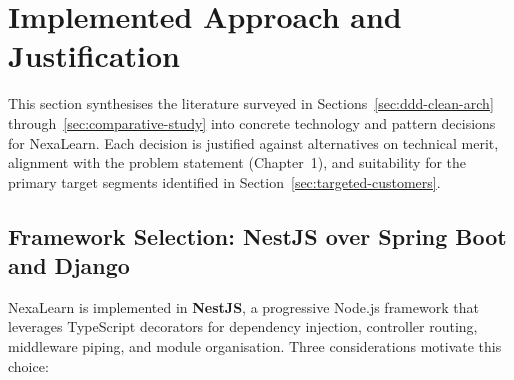 
\section{Implemented Approach and Justification}
\label{sec:implemented-approach}

This section synthesises the literature surveyed in Sections~\ref{sec:ddd-clean-arch} through~\ref{sec:comparative-study} into concrete technology and pattern decisions for NexaLearn. Each decision is justified against alternatives on technical merit, alignment with the problem statement (Chapter~1), and suitability for the primary target segments identified in Section~\ref{sec:targeted-customers}.

\subsection{Framework Selection: NestJS over Spring Boot and Django}

NexaLearn is implemented in \textbf{NestJS}\cite{nestjs2024}, a progressive Node.js framework that leverages TypeScript decorators for dependency injection, controller routing, middleware piping, and module organisation. Three considerations motivate this choice:

